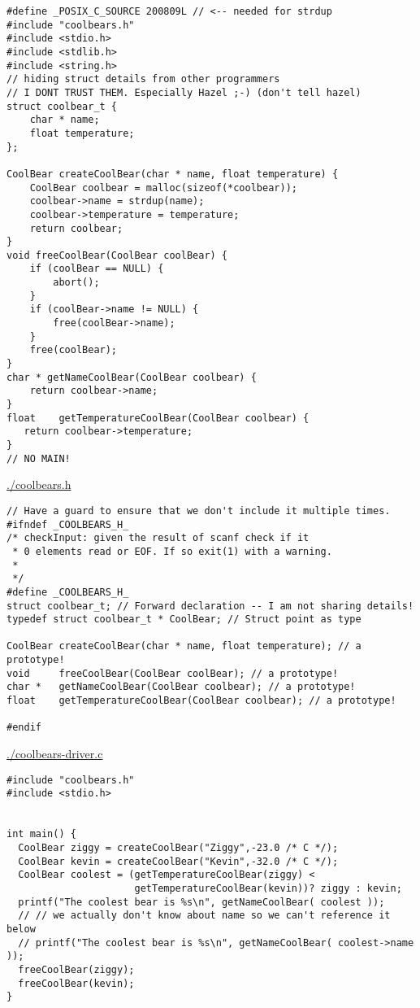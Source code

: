 \documentclass[11pt]{article}
\begin{document}
\begin{verbatim}
#define _POSIX_C_SOURCE 200809L // <-- needed for strdup
#include "coolbears.h"
#include <stdio.h>
#include <stdlib.h>
#include <string.h>
// hiding struct details from other programmers
// I DONT TRUST THEM. Especially Hazel ;-) (don't tell hazel)
struct coolbear_t {
    char * name;
    float temperature;
};

CoolBear createCoolBear(char * name, float temperature) {
    CoolBear coolbear = malloc(sizeof(*coolbear));
    coolbear->name = strdup(name);
    coolbear->temperature = temperature;
    return coolbear;
}
void freeCoolBear(CoolBear coolBear) {
    if (coolBear == NULL) {
        abort();
    }
    if (coolBear->name != NULL) {
        free(coolBear->name);
    }
    free(coolBear);
}
char * getNameCoolBear(CoolBear coolbear) {
    return coolbear->name;
}
float    getTemperatureCoolBear(CoolBear coolbear) {
   return coolbear->temperature;
}
// NO MAIN!
\end{verbatim}



\url{./coolbears.h}

\begin{verbatim}
// Have a guard to ensure that we don't include it multiple times.
#ifndef _COOLBEARS_H_
/* checkInput: given the result of scanf check if it 
 * 0 elements read or EOF. If so exit(1) with a warning.
 *
 */
#define _COOLBEARS_H_
struct coolbear_t; // Forward declaration -- I am not sharing details!
typedef struct coolbear_t * CoolBear; // Struct point as type

CoolBear createCoolBear(char * name, float temperature); // a prototype!
void     freeCoolBear(CoolBear coolBear); // a prototype!
char *   getNameCoolBear(CoolBear coolbear); // a prototype!
float    getTemperatureCoolBear(CoolBear coolbear); // a prototype!

#endif
\end{verbatim}

\url{./coolbears-driver.c}

\begin{verbatim}
#include "coolbears.h"
#include <stdio.h>


int main() {
  CoolBear ziggy = createCoolBear("Ziggy",-23.0 /* C */);
  CoolBear kevin = createCoolBear("Kevin",-32.0 /* C */);
  CoolBear coolest = (getTemperatureCoolBear(ziggy) < 
                      getTemperatureCoolBear(kevin))? ziggy : kevin;
  printf("The coolest bear is %s\n", getNameCoolBear( coolest ));
  // // we actually don't know about name so we can't reference it below
  // printf("The coolest bear is %s\n", getNameCoolBear( coolest->name ));
  freeCoolBear(ziggy);
  freeCoolBear(kevin);
}
\end{verbatim}
\end{document}
